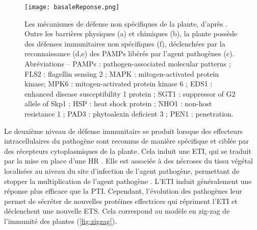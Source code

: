  \begin{figure}[h]
  \centering
  \texttt{[image: basaleReponse.png]}
  \caption[Les mécanismes de défense non spécifiques de la plante]{Les mécanismes de défense non spécifiques de la 
   plante, d’après \citet{Nurnberger2005}. Outre les barrières physiques (a) et chimiques (b), la plante possède des 
   défenses immunitaires non spécifiques (f), déclenchées par la reconnaissance (d,e) des \glspl{PAMP} libérés par 
   l'agent pathogènes (c).  \\
   Abréviations -- \small PAMPs : pathogen-associated molecular patterns ;  FLS2 : flagellin sensing 2 ; MAPK :   
   mitogen-activated protein kinase; MPK6 : mitogen-activated protein kinase 6 ; EDS1 : enhanced disease susceptibility 
   1 protein ; SGT1 : suppressor of G2 allele of Skp1 ; HSP : heat shock protein ; NHO1 : non-host resistance  1 ; PAD3 
   : phytoalexin deficient 3 ; PEN1 : penetration.}
  \label{fig:pamps}
 \end{figure}
	
	Le deuxième niveau de défense immunitaire se produit lorsque des effecteurs intracellulaires du pathogène sont reconnus de manière spécifique et ciblée par des récepteurs cytoplasmiques de la plante. Cela induit une  \gls{ETI}, qui se traduit par la mise en place d’une \gls{HR}  \citep{Jones2006}.  Elle est associée à des nécroses du tissu végétal localisées au niveau du site d’infection de l'agent pathogène, permettant de stopper la multiplication de l'agent pathogène \citep{Dropkin1969, Hammond-Kosack1996, Morel1997, Govrin2000, Kliebenstein2008}. L’\gls{ETI} induit généralement une réponse plus efficace que la \gls{PTI}. Cependant, l'évolution des pathogènes leur permet de sécréter de nouvelles  protéines effectrices  qui répriment l’\gls{ETI} et  déclenchent une nouvelle \gls{ETS}. Cela correspond au modèle en \og zig-zag\fg{} de l'immunité des plantes (\autoref{fig:zigzag}).


